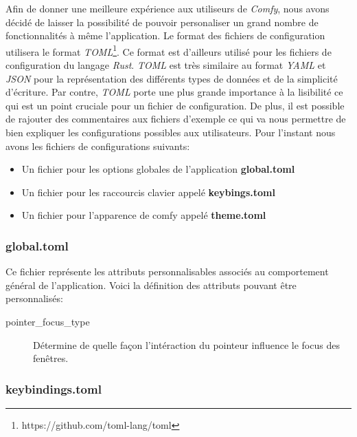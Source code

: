 \documentclass[titlepage]{article}
\begin{document}
\par
\bigskip
Afin de donner une meilleure expérience aux utiliseurs de \textit{Comfy}, nous avons décidé de laisser la possibilité de pouvoir personaliser un grand nombre de fonctionnalités à même l'application. Le format des fichiers de configuration utilisera le format \textit{TOML}\footnote{https://github.com/toml-lang/toml}. Ce format est d'ailleurs utilisé pour les fichiers de configuration du langage \textit{Rust}. \textit{TOML} est très similaire au format \textit{YAML} et \textit{JSON} pour la représentation des différents types de données et de la simplicité d'écriture. Par contre, \textit{TOML} porte une plus grande importance à la lisibilité ce qui est un point cruciale pour un fichier de configuration. De plus, il est possible de rajouter des commentaires aux fichiers d'exemple ce qui va nous permettre de bien expliquer les configurations possibles aux utilisateurs. Pour l'instant nous avons les fichiers de configurations suivants:
\begin{itemize}
	\item Un fichier pour les options globales de l'application \textbf{global.toml}
	\item Un fichier pour les raccourcis clavier appelé \textbf{keybings.toml}
	\item Un fichier pour l'apparence de comfy appelé \textbf{theme.toml}
\end{itemize}

\subsubsection{global.toml}
\begin{minipage}{\linewidth}
	
\end{minipage}

\par
Ce fichier représente les attributs personnalisables associés au comportement général de l'application. Voici la définition des attributs pouvant être personnalisés:
\begin{description}
	\item [pointer\_focus\_type] Détermine de quelle façon l'intéraction du pointeur influence le focus des fenêtres.
\end{description}

\subsubsection{keybindings.toml}
\begin{minipage}{\linewidth}
	
\end{minipage}
\end{document}
